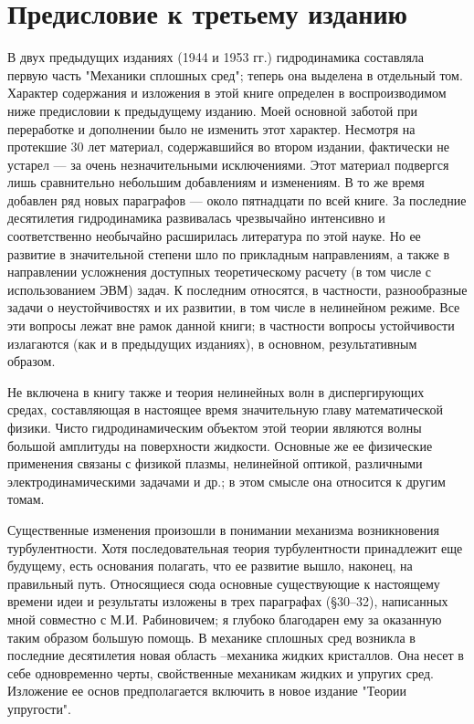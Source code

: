 \chapter{Предисловие к третьему изданию}

В двух предыдущих изданиях (1944 и 1953 гг.) гидродинамика составляла первую
часть "Механики сплошных сред"; теперь она выделена в отдельный том. Характер
содержания и изложения в этой книге определен в воспроизводимом ниже предисловии
к предыдущему изданию. Моей основной заботой при переработке и дополнении было
не изменить этот характер. Несмотря на протекшие 30 лет материал, содержавшийся
во втором издании, фактически не устарел --- за очень незначительными
исключениями. Этот материал подвергся лишь сравнительно небольшим добавлениям и
изменениям. В то же время добавлен ряд новых параграфов --- около пятнадцати по
всей книге. За последние десятилетия гидродинамика развивалась чрезвычайно
интенсивно и соответственно необычайно расширилась литература по этой науке. Но
ее развитие в значительной степени шло по прикладным направлениям, а также в
направлении усложнения доступных теоретическому расчету (в том числе с
использованием ЭВМ) задач. К последним относятся, в частности, разнообразные
задачи о неустойчивостях и их развитии, в том числе в нелинейном режиме. Все эти
вопросы лежат вне рамок данной книги; в частности вопросы устойчивости
излагаются (как и в предыдущих изданиях), в основном, результативным образом.

Не включена в книгу также и теория нелинейных волн в диспергирующих средах,
составляющая в настоящее время значительную главу математической физики. Чисто
гидродинамическим объектом этой теории являются волны большой амплитуды на
поверхности жидкости. Основные же ее физические применения связаны с физикой
плазмы, нелинейной оптикой, различными электродинамическими задачами и др.; в
этом смысле она относится к другим томам.

Существенные изменения произошли в понимании механизма возникновения
турбулентности. Хотя последовательная теория турбулентности принадлежит еще
будущему, есть основания полагать, что ее развитие вышло, наконец, на правильный
путь. Относящиеся сюда основные существующие к настоящему времени идеи и
результаты изложены в трех параграфах (\S30--32), написанных мной совместно с
М.И. Рабиновичем; я глубоко благодарен ему за оказанную таким образом большую
помощь. В механике сплошных сред возникла в последние десятилетия новая область
--механика жидких кристаллов. Она несет в себе одновременно черты, свойственные
механикам жидких и упругих сред. Изложение ее основ предполагается включить в
новое издание "Теории упругости".

